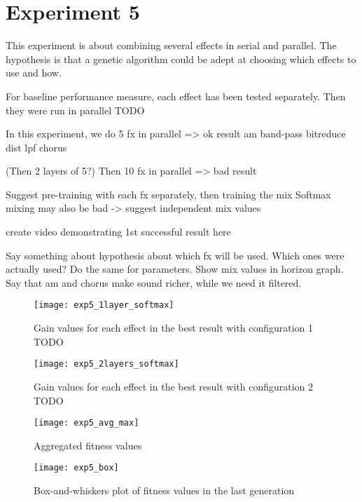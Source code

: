 \section{Experiment 5}
This experiment is about combining several effects in serial and parallel. The hypothesis is that a genetic algorithm could be adept at choosing which effects to use and how.

For baseline performance measure, each effect has been tested separately. Then they were run in parallel TODO



In this experiment, we do 5 fx in parallel => ok result
am
band-pass
bitreduce
dist lpf
chorus

(Then 2 layers of 5?)
Then 10 fx in parallel => bad result

Suggest pre-training with each fx separately, then training the mix
Softmax mixing may also be bad -> suggest independent mix values

create video demonstrating 1st successful result here

Say something about hypothesis about which fx will be used. Which ones were actually used? Do the same for parameters. Show mix values in horizon graph. Say that am and chorus make sound richer, while we need it filtered.

\begin{figure}[h]
    \centering
    \texttt{[image: exp5\_1layer\_softmax]}
    \caption{Gain values for each effect in the best result with configuration 1 TODO}
    \label{fig:exp5_1layer_softmax}
\end{figure}

\begin{figure}[h]
    \centering
    \texttt{[image: exp5\_2layers\_softmax]}
    \caption{Gain values for each effect in the best result with configuration 2 TODO}
    \label{fig:exp5_2layers_softmax}
\end{figure}

\begin{figure}[h]
    \centering
    \texttt{[image: exp5\_avg\_max]}
    \caption{Aggregated fitness values}
    \label{fig:exp5_avg_max}
\end{figure}

\begin{figure}[h]
    \centering
    \texttt{[image: exp5\_box]}
    \caption{Box-and-whiskers plot of fitness values in the last generation}
    \label{fig:exp5_box}
\end{figure}
